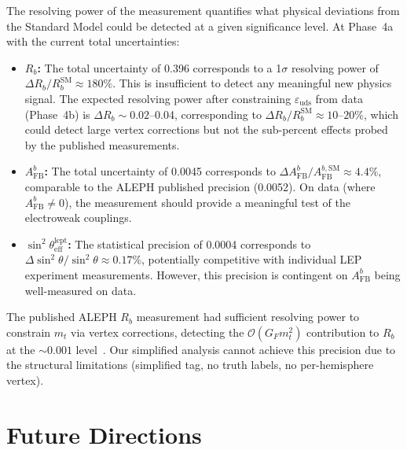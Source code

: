 \documentclass[11pt,a4paper]{article}
\begin{document}
The resolving power of the measurement quantifies what physical deviations from the
Standard Model could be detected at a given significance level. At Phase~4a with the
current total uncertainties:

\begin{itemize}
\item \textbf{$R_b$:} The total uncertainty of 0.396 corresponds to a 1$\sigma$ resolving
power of $\Delta R_b / R_b^\mathrm{SM} \approx 180\%$. This is insufficient to detect
any meaningful new physics signal. The expected resolving power after constraining
$\varepsilon_\mathrm{uds}$ from data (Phase~4b) is $\Delta R_b \sim 0.02$--0.04,
corresponding to $\Delta R_b / R_b^\mathrm{SM} \approx 10$--$20\%$, which could detect
large vertex corrections but not the sub-percent effects probed by the published
measurements.

\item \textbf{$A_\mathrm{FB}^b$:} The total uncertainty of 0.0045 corresponds to
$\Delta A_\mathrm{FB}^b / A_\mathrm{FB}^{b,\mathrm{SM}} \approx 4.4\%$, comparable
to the ALEPH published precision (0.0052). On data (where $A_\mathrm{FB}^b \neq 0$),
the measurement should provide a meaningful test of the electroweak couplings.

\item \textbf{$\sin^2\theta_\mathrm{eff}^\mathrm{lept}$:} The statistical precision
of 0.0004 corresponds to $\Delta \sin^2\theta / \sin^2\theta \approx 0.17\%$,
potentially competitive with individual LEP experiment measurements. However, this
precision is contingent on $A_\mathrm{FB}^b$ being well-measured on data.
\end{itemize}

The published ALEPH $R_b$ measurement had sufficient resolving power to constrain
$m_t$ via vertex corrections, detecting the $\mathcal{O}(G_F m_t^2)$ contribution
to $R_b$ at the $\sim 0.001$ level~\cite{ALEPH:Rb:1996}. Our simplified analysis
cannot achieve this precision due to the structural limitations (simplified tag,
no truth labels, no per-hemisphere vertex).

\FloatBarrier
{}
\section{Future Directions}
\label{sec:future}
\end{document}
